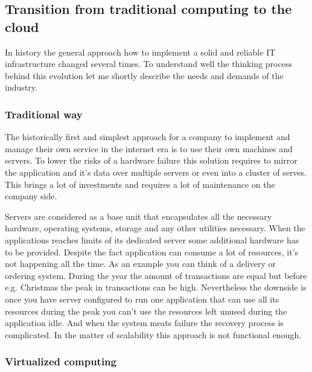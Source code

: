 \subsection{Transition from traditional computing to the cloud}
\label{sub:Transition from traditional computing to the cloud}

In history the general approach how to implement a solid and reliable IT infrastructure changed several times. To understand well the thinking process behind this evolution let me shortly describe the needs and demands of the industry.

\subsubsection{Traditional way}
\label{subs:Traditional way}

The historically first and simplest approach for a company to implement and manage their own service in the internet era is to use their own machines and servers. To lower the risks of a hardware failure this solution requires to mirror the application and it's data over multiple servers or even into a cluster of serves. This brings a lot of investments and requires a lot of maintenance on the company side.

Servers are considered as a base unit that encapsulates all the necessary hardware, operating systems, storage and any other utilities necessary. When the applications reaches limits of its dedicated server some additional hardware has to be provided. Despite the fact application can consume a lot of resources, it's not happening all the time. As an example you can think of a delivery or ordering system. During the year the amount of transactions are equal but before e.g. Christmas the peak in transactions can be high. Nevertheless the downside is once you have server configured to run one application that can use all its resources during the peak you can't use the resources left unused during the application idle. And when the system meats failure the recovery process is complicated. In the matter of scalability this approach is not functional enough.

\subsubsection{Virtualized computing}
\label{subs:Virtualized computing}

